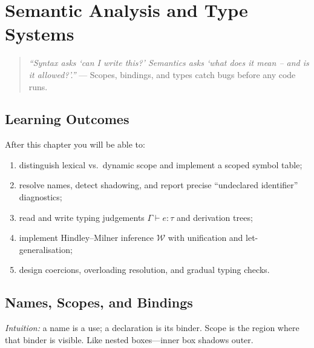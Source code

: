 \chapter{Semantic Analysis and Type Systems}
\label{ch:semantic}

\begin{quote}
\emph{``Syntax asks `can I write this?' Semantics asks `what does it mean -- and is it allowed?'.''} --- Scopes, bindings, and types catch bugs before any code runs.
\end{quote}

\noindent{}
\vspace{0.4em}

\section*{Learning Outcomes}
After this chapter you will be able to:
\begin{enumerate}[label=(L\arabic*)]
    \item distinguish lexical vs.\ dynamic scope and implement a scoped symbol table;
    \item resolve names, detect shadowing, and report precise ``undeclared identifier'' diagnostics;
    \item read and write typing judgements $\Gamma\vdash e:\tau$ and derivation trees;
    \item implement Hindley--Milner inference $\mathcal{W}$ with unification and let-generalisation;
    \item design coercions, overloading resolution, and gradual typing checks.
\end{enumerate}

\section{Names, Scopes, and Bindings}
\label{sec:names}
\emph{Intuition:} a name is a use; a declaration is its binder. Scope is the region where that binder is visible. Like nested boxes---inner box shadows outer.

